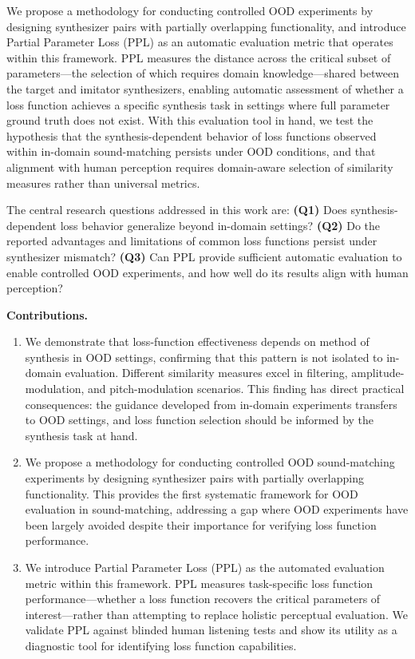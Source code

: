\documentclass[10pt]{article} %
\begin{document}
We propose a methodology for conducting controlled OOD experiments by designing synthesizer pairs with partially overlapping functionality, and introduce Partial Parameter Loss (PPL) as an automatic evaluation metric that operates within this framework. PPL measures the distance across the critical subset of parameters---the selection of which requires domain knowledge---shared between the target and imitator synthesizers, enabling automatic assessment of whether a loss function achieves a specific synthesis task in settings where full parameter ground truth does not exist. With this evaluation tool in hand, we test the hypothesis that the synthesis-dependent behavior of loss functions observed within in-domain sound-matching persists under OOD conditions, and that alignment with human perception requires domain-aware selection of similarity measures rather than universal metrics.

The central research questions addressed in this work are: \textbf{(Q1)} Does synthesis-dependent loss behavior generalize beyond in-domain settings? \textbf{(Q2)} Do the reported advantages and limitations of common loss functions persist under synthesizer mismatch? \textbf{(Q3)} Can PPL provide sufficient automatic evaluation to enable controlled OOD experiments, and how well do its results align with human perception?


\textbf{Contributions.} 
\begin{enumerate}
    \item We demonstrate that loss-function effectiveness depends on method of synthesis in OOD settings, confirming that this pattern is not isolated to in-domain evaluation. Different similarity measures excel in filtering, amplitude-modulation, and pitch-modulation scenarios. This finding has direct practical consequences: the guidance developed from in-domain experiments transfers to OOD settings, and loss function selection should be informed by the synthesis task at hand.

    \item  We propose a methodology for conducting controlled OOD sound-matching experiments by designing synthesizer pairs with partially overlapping functionality. This provides the first systematic framework for OOD evaluation in sound-matching, addressing a gap where OOD experiments have been largely avoided despite their importance for verifying loss function performance.
    
    \item We introduce Partial Parameter Loss (PPL) as the automated evaluation metric within this framework. PPL measures task-specific loss function performance---whether a loss function recovers the critical parameters of interest---rather than attempting to replace holistic perceptual evaluation. We validate PPL against blinded human listening tests and show its utility as a diagnostic tool for identifying loss function capabilities.

\end{enumerate}
\end{document}

